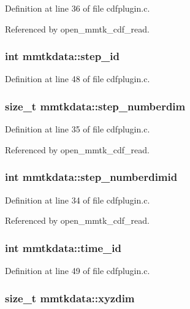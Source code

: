 Definition at line 36 of file cdfplugin.c.

Referenced by open\_\-mmtk\_\-cdf\_\-read.
\subsubsection{\setlength{\rightskip}{0pt plus 5cm}int mmtkdata::step\_\-id}\label{structmmtkdata_m14}




Definition at line 48 of file cdfplugin.c.
\subsubsection{\setlength{\rightskip}{0pt plus 5cm}size\_\-t mmtkdata::step\_\-numberdim}\label{structmmtkdata_m1}




Definition at line 35 of file cdfplugin.c.

Referenced by open\_\-mmtk\_\-cdf\_\-read.
\subsubsection{\setlength{\rightskip}{0pt plus 5cm}int mmtkdata::step\_\-numberdimid}\label{structmmtkdata_m0}




Definition at line 34 of file cdfplugin.c.

Referenced by open\_\-mmtk\_\-cdf\_\-read.
\subsubsection{\setlength{\rightskip}{0pt plus 5cm}int mmtkdata::time\_\-id}\label{structmmtkdata_m15}




Definition at line 49 of file cdfplugin.c.
\subsubsection{\setlength{\rightskip}{0pt plus 5cm}size\_\-t mmtkdata::xyzdim}\label{structmmtkdata_m7}




